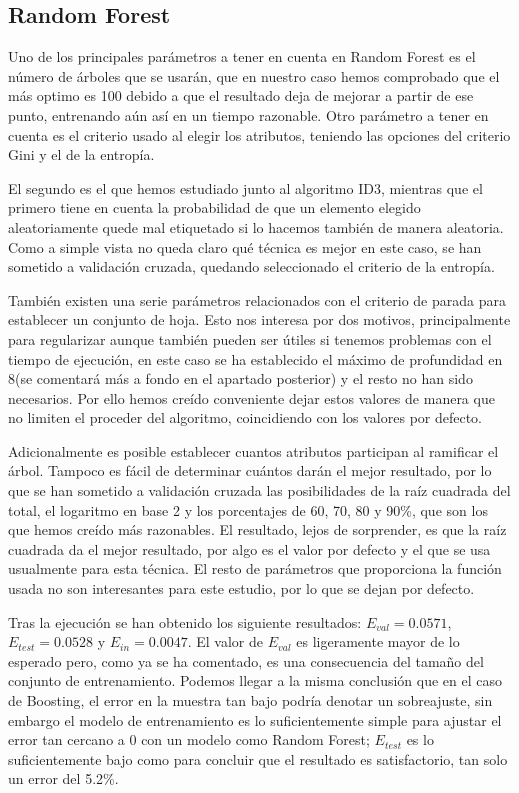 \documentclass{article}
\begin{document}
	\subsection{Random Forest}
	Uno de los principales parámetros a tener en cuenta en Random Forest es el número de árboles que se usarán, que en nuestro caso hemos comprobado que el más optimo es 100 debido a que el resultado deja de mejorar a partir de ese punto, entrenando aún así en un tiempo razonable. Otro parámetro a tener en cuenta es el criterio usado al elegir los atributos, teniendo las opciones del criterio Gini y el de la entropía.
	\par
	El segundo es el que hemos estudiado junto al algoritmo ID3, mientras que el primero tiene en cuenta la probabilidad de que un elemento elegido aleatoriamente quede mal etiquetado si lo hacemos también de manera aleatoria. Como a simple vista no queda claro qué técnica es mejor en este caso, se han sometido a validación cruzada, quedando seleccionado el criterio de la entropía.
	\par
	También existen una serie parámetros relacionados con el criterio de parada para establecer un conjunto de hoja. Esto nos interesa por dos motivos, principalmente para regularizar aunque también pueden ser útiles si tenemos problemas con el tiempo de ejecución, en este caso se ha establecido el máximo de profundidad en 8(se comentará más a fondo en el apartado posterior) y el resto no han sido necesarios. Por ello hemos creído conveniente dejar estos valores de manera que no limiten el proceder del algoritmo, coincidiendo con los valores por defecto.
	\par
	Adicionalmente es posible establecer cuantos atributos participan al ramificar el árbol. Tampoco es fácil de determinar cuántos darán el mejor resultado, por lo que se han sometido a validación cruzada las posibilidades de la raíz cuadrada del total, el logaritmo en base 2 y los porcentajes de 60, 70, 80 y 90\%, que son los que hemos creído más razonables. El resultado, lejos de sorprender, es que la raíz cuadrada da el mejor resultado, por algo es el valor por defecto y el que se usa usualmente para esta técnica. El resto de parámetros que proporciona la función usada no son interesantes para este estudio, por lo que se dejan por defecto.
	\par
	Tras la ejecución se han obtenido los siguiente resultados: $E_{val} = 0.0571$, $E_{test} = 0.0528$ y $E_{in} = 0.0047$. El valor de $E_{val}$ es ligeramente mayor de lo esperado pero, como ya se ha comentado, es una consecuencia del tamaño del conjunto de entrenamiento. Podemos llegar a la misma conclusión que en el caso de Boosting, el error en la muestra tan bajo podría denotar un sobreajuste, sin embargo el modelo de entrenamiento es lo suficientemente simple para ajustar el error tan cercano a 0 con un modelo como Random Forest; $E_{test}$ es lo suficientemente bajo como para concluir que el resultado es satisfactorio, tan solo un error del 5.2\%.
	
\end{document}
